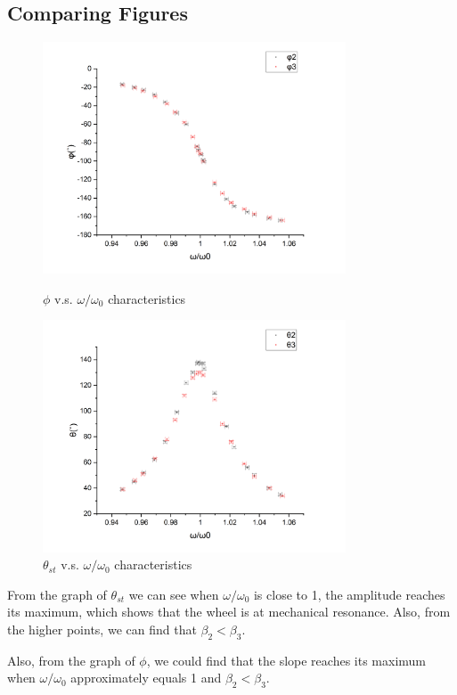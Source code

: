 \documentclass[12pt,a4paper]{article}
\begin{document}
\subsection{Comparing Figures}
   
\begin{figure}[H]
    \begin{minipage}[t]{9cm}
    \centering
    \includegraphics[width=9cm]{phi.png}
    \caption{$\phi$ v.s. $\omega/\omega_0$ characteristics}
    \end{minipage}
    \begin{minipage}[t]{9cm}
    \centering
    \includegraphics[width=9cm]{theta.png}
    \caption{$\theta_{st}$ v.s. $\omega/\omega_0$ characteristics}
    \end{minipage}
\end{figure}

From the graph of $\theta_{st}$ we can see when $\omega/\omega_0$ is close to 1, the amplitude reaches its maximum, which shows that the wheel is at mechanical resonance. Also, from the higher points, we can find that $\beta_2<\beta_3$. \par 
Also, from the graph of $\phi$, we could find that the slope reaches its maximum when $\omega/\omega_0$ approximately equals 1 and $\beta_2<\beta_3$.  
\end{document}
